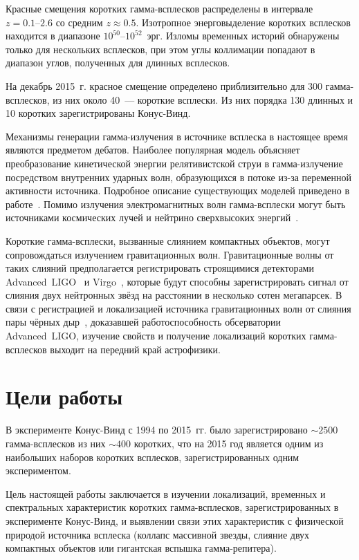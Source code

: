 Красные смещения коротких гамма-всплесков распределены в интервале $z=0.1\mbox{--}2.6$ 
со средним $z\approx 0.5$.
Изотропное энерговыделение коротких всплесков находится в диапазоне $10^{50}$--$10^{52}$~эрг.
Изломы временных историй обнаружены только для нескольких всплесков, при этом углы коллимации 
попадают в диапазон углов, полученных для длинных всплесков. 

На декабрь 2015~г. красное смещение определено приблизительно для 300 гамма-всплесков, 
из них около 40~--- короткие всплески. Из них порядка 130 длинных и 10 коротких 
зарегистрированы Конус-Винд.

Механизмы генерации гамма-излучения в источнике всплеска в настоящее время 
являются предметом дебатов. Наиболее популярная модель объясняет преобразование 
кинетической энергии релятивистской струи в гамма-излучение посредством внутренних
ударных волн, образующихся в потоке из-за переменной активности источника.
Подробное описание существующих моделей приведено в работе~\citep{Kumar_and_Zhang_2014PhR}.
Помимо излучения электромагнитных волн гамма-всплески могут быть источниками
космических лучей и нейтрино сверхвысоких энергий~\citep{Aartsen_2015ApJ,Baerwald_2015APh}.

Короткие гамма-всплески, вызванные слиянием компактных объектов, могут сопровождаться излучением гравитационных волн. 
Гравитационные волны от таких слияний предполагается регистрировать строящимися 
детекторами Advanced~LIGO~\citep{Harry_2010CQGra} и Virgo~\citep{Accadia_2012JInst}, 
которые будут способны зарегистрировать сигнал от слияния
двух нейтронных звёзд на расстоянии в несколько сотен мегапарсек. 
В связи с регистрацией и локализацией источника гравитационных
волн от слияния пары чёрных дыр~\citep{Abbott_2016PhRvL}, доказавшей работоспособность обсерватории 
Advanced~LIGO, изучение свойств и получение локализаций коротких гамма-всплесков 
выходит на передний край астрофизики.


\section*{Цели работы}
В эксперименте Конус-Винд с 1994 по 2015~гг. было зарегистрировано 
$\sim 2500$ гамма-всплесков из них $\sim 400$ коротких, что на 2015 год является 
одним из наибольших наборов коротких всплесков, зарегистрированных 
одним экспериментом.

Цель настоящей работы заключается в изучении локализаций, временных и спектральных характеристик 
коротких гамма-всплесков, зарегистрированных в эксперименте Конус-Винд, и выявлении 
связи этих характеристик с физической природой источника всплеска 
(коллапс массивной звезды, слияние двух компактных объектов или гигантская вспышка гамма-репитера).

